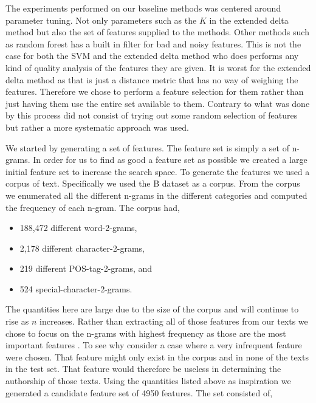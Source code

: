The experiments performed on our baseline methods was centered around parameter
tuning. Not only parameters such as the $K$ in the extended delta method but
also the set of features supplied to the methods. Other methods such as random
forest has a built in filter for bad and noisy features. This is not the case
for both the \gls{SVM} and the extended delta method who does performs any kind
of quality analysis of the features they are given. It is worst for the extended
delta method as that is just a distance metric that has no way of weighing the
features. Therefore we chose to perform a feature selection for them rather than
just having them use the entire set available to them. Contrary to what was done
by \citet{US} this process did not consist of trying out some random selection
of features but rather a more systematic approach was used.

We started by generating a set of features. The feature set is simply a set of
n-grams. In order for us to find as good a feature set as possible we created a
large initial feature set to increase the search space. To generate the
features we used a corpus of text. Specifically we used the \gls{B} dataset as a
corpus. From the corpus we enumerated all the different n-grams in the different
categories and computed the frequency of each n-gram. The corpus had,

\begin{itemize}
    \item 188,472 different word-2-grams,
    \item 2,178 different character-2-grams,
    \item 219 different \gls{POS}-tag-2-grams, and
    \item 524 special-character-2-grams.
\end{itemize}

The quantities here are large due to the size of the corpus and will continue
to rise as $n$ increases. Rather than extracting all of those features from
our texts we chose to focus on the n-grams with highest frequency as those are
the most important features \citep{stamatos2009}. To see why consider a case
where a very infrequent feature were chosen. That feature might only exist
in the corpus and in none of the texts in the test set. That feature would
therefore be useless in determining the authorship of those texts. Using the
quantities listed above as inspiration we generated a candidate feature set of
4950 features. The set consisted of,


